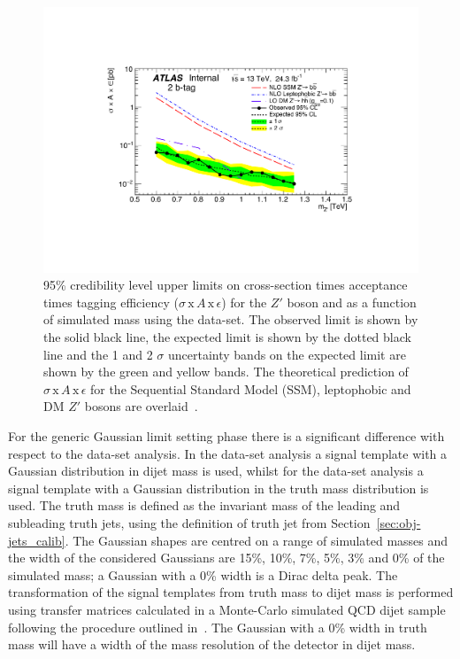 \begin{figure}[!t]
  \centering
  \includegraphics[width=0.9\linewidth, angle=0]{figs/Dibjet/LowMass/lim-zprime.pdf}
  \caption[95\% credibility level upper limits on
           cross-section times acceptance times tagging efficiency
           ($\sigma\,\text{x}\,\mathit{A}\,\text{x}\,\epsilon$)
           for the $Z'$ boson and as a function of simulated mass using the \lm{} data-set.]
          {95\% credibility level upper limits on cross-section times acceptance times tagging efficiency
            ($\sigma\,\text{x}\,\mathit{A}\,\text{x}\,\epsilon$)
             for the $Z'$ boson and as a function of simulated mass using the \lm{} data-set.
             The observed limit is shown by the solid black line, the expected limit is shown by the dotted black line
             and the 1 and 2 $\sigma$ uncertainty bands on the expected limit are shown by the green and yellow bands.
             The theoretical prediction of $\sigma\,\text{x}\,\mathit{A}\,\text{x}\,\epsilon$
             for the Sequential Standard Model (SSM), leptophobic and DM $Z'$ bosons are overlaid~\cite{dibjet-full_int}.}
  \label{fig:lim-lowmass_benchmark}
\end{figure}

For the generic Gaussian limit setting phase there is a significant difference
with respect to the \summer{} data-set analysis.
In the \summer{} data-set analysis a signal template with a Gaussian distribution in dijet mass is used,
whilst for the \lm{} data-set analysis a signal template with a Gaussian distribution in the truth mass distribution is used.
The truth mass is defined as the invariant mass of the leading and subleading truth jets,
using the definition of truth jet from Section~\ref{sec:obj-jets_calib}.
The Gaussian shapes are centred on a range of simulated masses and the width of the considered Gaussians are
15\%, 10\%, 7\%, 5\%, 3\% and 0\% of the simulated mass;
a Gaussian with a 0\% width is a Dirac delta peak.
The transformation of the signal templates from truth mass to dijet mass is performed using
transfer matrices calculated in a Monte-Carlo simulated QCD dijet sample
following the procedure outlined in~\cite{dijet-mori17_paper}.
The Gaussian with a 0\% width in truth mass will have
a width of the mass resolution of the detector in dijet mass.

